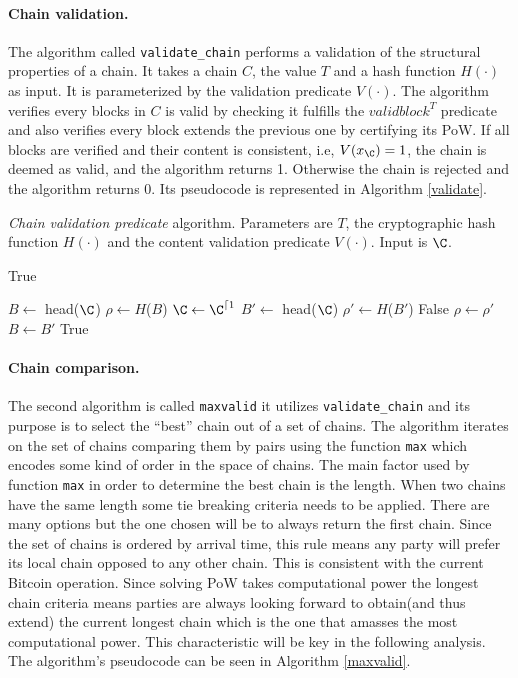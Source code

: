 \documentclass[..]{subfiles}
\begin{document}
\paragraph{Chain validation.} The algorithm called \texttt{validate\_chain} performs a validation of the structural properties of a chain. It takes a chain $C$, the value $T$ and a hash function $H(\cdot)$ as input. It is parameterized by the validation predicate $V(\cdot)$. The algorithm verifies every blocks in $C$ is valid by checking it fulfills the $validblock^T$ predicate and also verifies every block extends the previous one by certifying its PoW. If all blocks are verified and their content is consistent, i.e, $V(x_\C) = 1$, the chain is deemed as valid, and the algorithm returns 1. Otherwise the chain is rejected and the algorithm returns 0. Its pseudocode is represented in Algorithm \ref{validate}.

\begin{algorithm}
	\caption{\textit{Chain validation predicate} algorithm. Parameters are $T$, the cryptographic hash function $H(\cdot)$ and the content validation predicate $V(\cdot)$. Input is $\C$.}\label{validate}
\begin{algorithmic}[1]
	\If{$\C = \epsilon$}
		\State \Return True
	\EndIf
	\State

		\State $B \gets$ head($\C$)
		\State $\rho \gets H$($B$)
		\Repeat 
			\State $\C \gets \C^{\lceil 1}$
			\State $B' \gets$ head($\C$)
			\State $\rho' \gets H$($B'$)
				\State \Return False
			\EndIf
			\State $\rho \gets \rho'$
			\State $B \gets B'$
		\Until{($\C = \epsilon$)}
	\EndIf
	\State
	\Return True
	\EndFunction
\end{algorithmic}
\end{algorithm}


\paragraph{Chain comparison.} The second algorithm is called \texttt{maxvalid} it utilizes \texttt{validate\_chain} and its purpose is to select the ``best'' chain out of a set of chains. The algorithm iterates on the set of chains comparing them by pairs using the function \texttt{max} which encodes some kind of order in the space of chains. The main factor used by function \texttt{max} in order to determine the best chain is the length. When two chains have the same length some tie breaking criteria needs to be applied. There are many options but the one chosen will be to always return the first chain. Since the set of chains is ordered by arrival time, this rule means any party will prefer its local chain opposed to any other chain. This is consistent with the current Bitcoin operation. Since solving PoW takes computational power the longest chain criteria means parties are always looking forward to obtain(and thus extend) the current longest chain which is the one that amasses the most computational power. This characteristic will be key in the following analysis. The algorithm's pseudocode can be seen in Algorithm \ref{maxvalid}.
\end{document}
